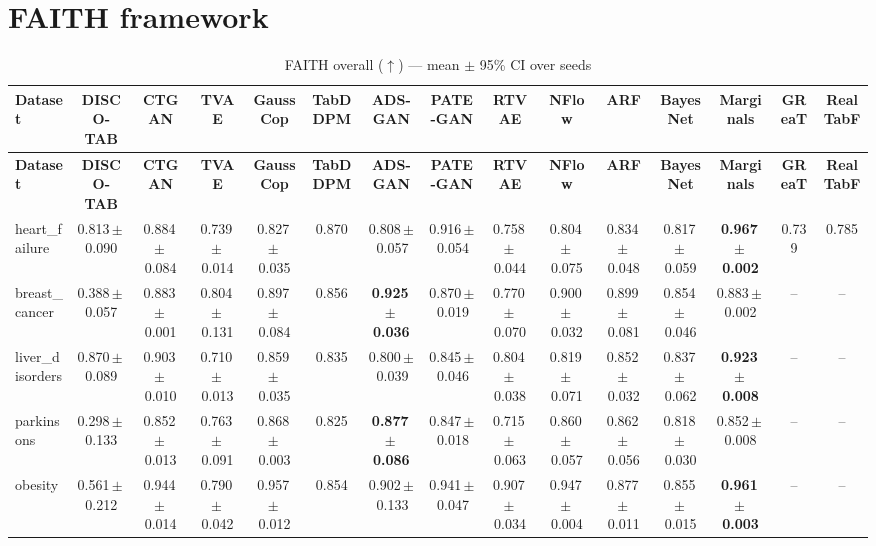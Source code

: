 \documentclass[8pt]{extarticle}
\begin{document}
\section*{FAITH framework}
\begin{longtable}{l*{14}{c}}
\caption{FAITH overall ($\uparrow$) --- mean $\pm$ 95\% CI over seeds}\\
\toprule
\textbf{Dataset} & \textbf{DISCO-TAB} & \textbf{CTGAN} & \textbf{TVAE} & \textbf{GaussCop} & \textbf{TabDDPM} & \textbf{ADS-GAN} & \textbf{PATE-GAN} & \textbf{RTVAE} & \textbf{NFlow} & \textbf{ARF} & \textbf{BayesNet} & \textbf{Marginals} & \textbf{GReaT} & \textbf{RealTabF} \\
\midrule
\endfirsthead
\toprule
\textbf{Dataset} & \textbf{DISCO-TAB} & \textbf{CTGAN} & \textbf{TVAE} & \textbf{GaussCop} & \textbf{TabDDPM} & \textbf{ADS-GAN} & \textbf{PATE-GAN} & \textbf{RTVAE} & \textbf{NFlow} & \textbf{ARF} & \textbf{BayesNet} & \textbf{Marginals} & \textbf{GReaT} & \textbf{RealTabF} \\
\midrule
\endhead
\bottomrule
\endfoot
heart\_failure & 0.813\,$\pm$\,0.090 & 0.884\,$\pm$\,0.084 & 0.739\,$\pm$\,0.014 & 0.827\,$\pm$\,0.035 & 0.870 & 0.808\,$\pm$\,0.057 & 0.916\,$\pm$\,0.054 & 0.758\,$\pm$\,0.044 & 0.804\,$\pm$\,0.075 & 0.834\,$\pm$\,0.048 & 0.817\,$\pm$\,0.059 & \textbf{0.967\,$\pm$\,0.002} & 0.739 & 0.785 \\
breast\_cancer & 0.388\,$\pm$\,0.057 & 0.883\,$\pm$\,0.001 & 0.804\,$\pm$\,0.131 & 0.897\,$\pm$\,0.084 & 0.856 & \textbf{0.925\,$\pm$\,0.036} & 0.870\,$\pm$\,0.019 & 0.770\,$\pm$\,0.070 & 0.900\,$\pm$\,0.032 & 0.899\,$\pm$\,0.081 & 0.854\,$\pm$\,0.046 & 0.883\,$\pm$\,0.002 & -- & -- \\
liver\_disorders & 0.870\,$\pm$\,0.089 & 0.903\,$\pm$\,0.010 & 0.710\,$\pm$\,0.013 & 0.859\,$\pm$\,0.035 & 0.835 & 0.800\,$\pm$\,0.039 & 0.845\,$\pm$\,0.046 & 0.804\,$\pm$\,0.038 & 0.819\,$\pm$\,0.071 & 0.852\,$\pm$\,0.032 & 0.837\,$\pm$\,0.062 & \textbf{0.923\,$\pm$\,0.008} & -- & -- \\
parkinsons & 0.298\,$\pm$\,0.133 & 0.852\,$\pm$\,0.013 & 0.763\,$\pm$\,0.091 & 0.868\,$\pm$\,0.003 & 0.825 & \textbf{0.877\,$\pm$\,0.086} & 0.847\,$\pm$\,0.018 & 0.715\,$\pm$\,0.063 & 0.860\,$\pm$\,0.057 & 0.862\,$\pm$\,0.056 & 0.818\,$\pm$\,0.030 & 0.852\,$\pm$\,0.008 & -- & -- \\
obesity & 0.561\,$\pm$\,0.212 & 0.944\,$\pm$\,0.014 & 0.790\,$\pm$\,0.042 & 0.957\,$\pm$\,0.012 & 0.854 & 0.902\,$\pm$\,0.133 & 0.941\,$\pm$\,0.047 & 0.907\,$\pm$\,0.034 & 0.947\,$\pm$\,0.004 & 0.877\,$\pm$\,0.011 & 0.855\,$\pm$\,0.015 & \textbf{0.961\,$\pm$\,0.003} & -- & -- \\

\end{longtable}
\end{document}
